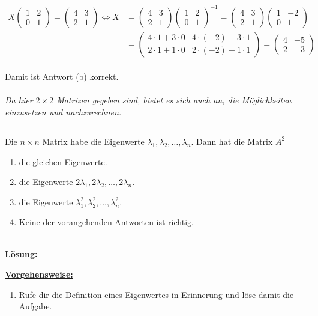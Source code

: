 \begin{align*}
X
\begin{pmatrix}
1 & 2 \\
0 & 1 
\end{pmatrix}
=
\begin{pmatrix}
4 & 3 \\
2 & 1
\end{pmatrix}
\Leftrightarrow
X
&=
\begin{pmatrix}
4 & 3 \\
2 & 1
\end{pmatrix}
\begin{pmatrix}
1 & 2 \\
0 & 1 
\end{pmatrix}^{-1}
= 
\begin{pmatrix}
4 & 3 \\
2 & 1
\end{pmatrix}
\begin{pmatrix}
1 & -2 \\
0 & 1 
\end{pmatrix}\\
&=
\begin{pmatrix}
4 \cdot 1+ 3\cdot 0 & 4 \cdot(-2) + 3 \cdot 1 \\
2 \cdot 1 + 1 \cdot 0 & 2 \cdot(-2) + 1 \cdot 1 
\end{pmatrix}
=
\begin{pmatrix}
4 & -5\\
2 & -3
\end{pmatrix}
\end{align*}
\ \\
Damit ist Antwort (b) korrekt.\\
\\
\textit{
Da hier $ 2 \times 2 $ Matrizen gegeben sind, bietet es sich auch an, die Möglichkeiten einzusetzen und nachzurechnen.
}

\newpage

\subsection*{}
Die $ n \times n $ Matrix habe die Eigenwerte $ \lambda_1, \lambda_2, \dots, \lambda_n $.
Dann hat die Matrix $ A^2 $
\renewcommand{\labelenumi}{(\alph{enumi})}
\begin{enumerate}
	\item 
	die gleichen Eigenwerte.
	\item
	die Eigenwerte $2 \lambda_1,2 \lambda_2, \dots,2 \lambda_n $.
	\item
	die Eigenwerte $ \lambda_1^2, \lambda_2^2, \dots, \lambda_n^2 $.
	\item
	Keine der vorangehenden Antworten ist richtig.
\end{enumerate}
\ \\
\textbf{Lösung:}
\begin{mdframed}
\underline{\textbf{Vorgehensweise:}}
\renewcommand{\labelenumi}{\theenumi.}
\begin{enumerate}
\item Rufe dir die Definition eines Eigenwertes in Erinnerung und löse damit die Aufgabe.
\end{enumerate}
\end{mdframed}

